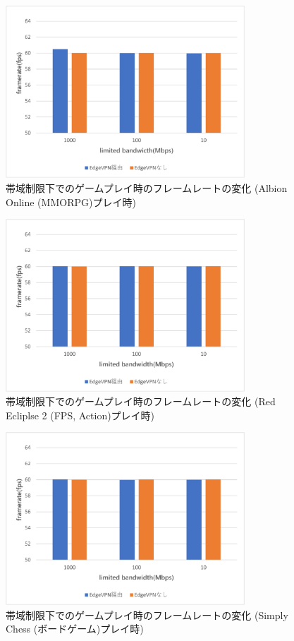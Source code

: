 \begin{figure}[t]
    \centering
    \includegraphics[width=0.8\textwidth,keepaspectratio,clip]{img/framerate_MMO.pdf}
    \caption{帯域制限下でのゲームプレイ時のフレームレートの変化 (Albion Online (MMORPG)プレイ時)}
    \label{fig:fps_mmo}
\end{figure}

\begin{figure}[t]
    \centering
    \includegraphics[width=0.8\textwidth,keepaspectratio,clip]{img/framerate_FPS.pdf}
    \caption{帯域制限下でのゲームプレイ時のフレームレートの変化 (Red Ecliplse 2 (FPS, Action)プレイ時)}
    \label{fig:fps_fps}
\end{figure}

\begin{figure}[t]
    \centering
    \includegraphics[width=0.8\textwidth,keepaspectratio,clip]{img/framerate_Board.pdf}
    \caption{帯域制限下でのゲームプレイ時のフレームレートの変化 (Simply Chess (ボードゲーム)プレイ時)}
    \label{fig:fps_board}
\end{figure}